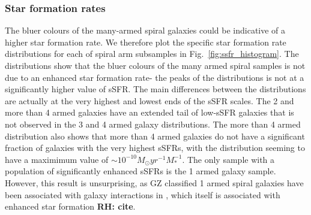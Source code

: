 \documentclass[useAMS,usenatbib]{mn2e}
\newcommand{\rh}[1]{{\bf \textcolor{RoyalPurple}{RH: #1}}}
\begin{document}

\subsubsection{Star formation rates}
\label{sec:SFR}

The bluer colours of the many-armed spiral galaxies could be indicative of a higher star formation rate. We therefore plot the specific star formation rate distributions for each of spiral arm subsamples in Fig.~\ref{fig:ssfr_histogram}. The distributions show that the bluer colours of the many armed spiral samples is not due to an enhanced star formation rate- the peaks of the distributions is not at a significantly higher value of sSFR. The main differences between the distributions are actually at the very highest and lowest ends of the sSFR scales. The 2 and more than 4 armed galaxies have an extended tail of low-sSFR galaxies that is not observed in the 3 and 4 armed galaxy distributions. The more than 4 armed distribution also shows that more than 4 armed galaxies do not have a significant fraction of galaxies with the very highest sSFRs, with the distribution seeming to have a maximimum value of $\sim 10^{-10} M_{\odot} yr^{-1}M_*^{-1}$. The only sample with a population of significantly enhanced sSFRs is the 1 armed galaxy sample. However, this result is unsurprising, as GZ classified 1 armed spiral galaxies have been associated with galaxy interactions in \citet{Casteels_13}, which itself is associated with enhanced star formation \rh{cite}.
\end{document}
